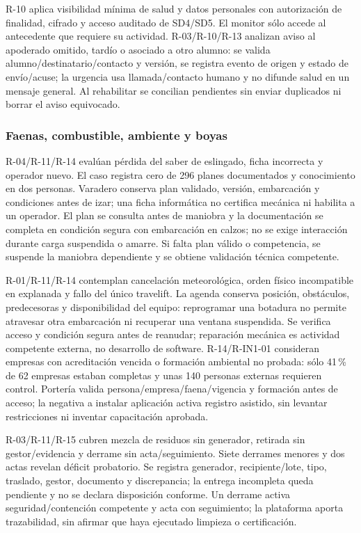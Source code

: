 R-10 aplica visibilidad mínima de salud y datos personales con autorización de finalidad, cifrado y acceso auditado de SD4/SD5. El monitor sólo accede al antecedente que requiere su actividad. R-03/R-10/R-13 analizan aviso al apoderado omitido, tardío o asociado a otro alumno: se valida alumno/destinatario/contacto y versión, se registra evento de origen y estado de envío/acuse; la urgencia usa llamada/contacto humano y no difunde salud en un mensaje general. Al rehabilitar se concilian pendientes sin enviar duplicados ni borrar el aviso equivocado.

\subsubsection{Faenas, combustible, ambiente y boyas}
R-04/R-11/R-14 evalúan pérdida del saber de eslingado, ficha incorrecta y operador nuevo. El caso registra cero de 296 planes documentados y conocimiento en dos personas. Varadero conserva plan validado, versión, embarcación y condiciones antes de izar; una ficha informática no certifica mecánica ni habilita a un operador. El plan se consulta antes de maniobra y la documentación se completa en condición segura con embarcación en calzos; no se exige interacción durante carga suspendida o amarre. Si falta plan válido o competencia, se suspende la maniobra dependiente y se obtiene validación técnica competente.

R-01/R-11/R-14 contemplan cancelación meteorológica, orden físico incompatible en explanada y fallo del único travelift. La agenda conserva posición, obstáculos, predecesoras y disponibilidad del equipo: reprogramar una botadura no permite atravesar otra embarcación ni recuperar una ventana suspendida. Se verifica acceso y condición segura antes de reanudar; reparación mecánica es actividad competente externa, no desarrollo de software. R-14/R-IN1-01 consideran empresas con acreditación vencida o formación ambiental no probada: sólo 41\,\% de 62 empresas estaban completas y unas 140 personas externas requieren control. Portería valida persona/empresa/faena/vigencia y formación antes de acceso; la negativa a instalar aplicación activa registro asistido, sin levantar restricciones ni inventar capacitación aprobada.

R-03/R-11/R-15 cubren mezcla de residuos sin generador, retirada sin gestor/evidencia y derrame sin acta/seguimiento. Siete derrames menores y dos actas revelan déficit probatorio. Se registra generador, recipiente/lote, tipo, traslado, gestor, documento y discrepancia; la entrega incompleta queda pendiente y no se declara disposición conforme. Un derrame activa seguridad/contención competente y acta con seguimiento; la plataforma aporta trazabilidad, sin afirmar que haya ejecutado limpieza o certificación.

